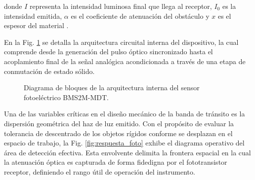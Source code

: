 \documentclass[conference]{IEEEtran}
\begin{document}
donde $I$ representa la intensidad luminosa final que llega al receptor, $I_0$ es la intensidad emitida, $\alpha$ es el coeficiente de atenuación del obstáculo y $x$ es el espesor del material \cite{sensores_17}. 

En la Fig. \ref{fig:bloques_fotoelectrico} se detalla la arquitectura circuital interna del dispositivo, la cual comprende desde la generación del pulso óptico sincronizado hasta el acoplamiento final de la señal analógica acondicionada a través de una etapa de conmutación de estado sólido.

\begin{figure}[htbp]
    \centering
    \caption{Diagrama de bloques de la arquitectura interna del sensor fotoeléctrico BMS2M-MDT.}
    \label{fig:bloques_fotoelectrico}
\end{figure}

Una de las variables críticas en el diseño mecánico de la banda de tránsito es la dispersión geométrica del haz de luz emitido. Con el propósito de evaluar la tolerancia de descentrado de los objetos rígidos conforme se desplazan en el espacio de trabajo, la Fig. \ref{fig:respuesta_foto} exhibe el diagrama operativo del área de detección efectiva. Esta envolvente delimita la frontera espacial en la cual la atenuación óptica es capturada de forma fidedigna por el fototransistor receptor, definiendo el rango útil de operación del instrumento.
\end{document}
